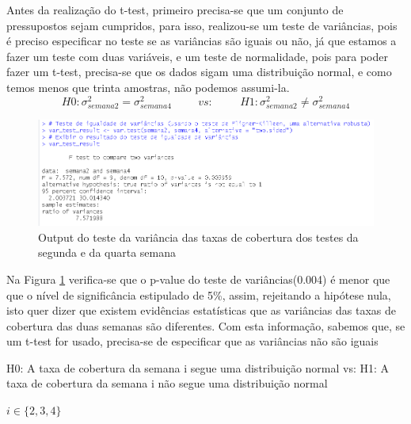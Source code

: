 \documentclass[%
 aip,
cp,  %
 amsmath,amssymb,%
 reprint,%
]{revtex4-2}
\begin{document}
Antes da realização do t-test, primeiro precisa-se que um conjunto de pressupostos sejam cumpridos, para isso, realizou-se um teste de variâncias, pois é preciso especificar no teste se as variâncias são iguais ou não, já que estamos a fazer um teste com duas variáveis, e um teste de normalidade, pois para poder fazer um t-test, precisa-se que os dados sigam uma distribuição normal, e como temos menos que trinta amostras, não podemos assumi-la.
\[ H0: \sigma^2_{semana2} = \sigma^2_{semana4}  \hspace{1cm} vs: \hspace{1cm} H1: \sigma^2_{semana2} \ne \sigma^2_{semana4} \]
\begin{figure}[h]
    \centering
    \includegraphics[width=15cm]{imagens/questao1/Output_variancia.png}
    \caption{Output do teste da variância das taxas de cobertura dos testes da segunda e da quarta semana}
    \label{Output_Variancia}
\end{figure}

Na Figura \ref{Output_Variancia} verifica-se que o p-value do teste de variâncias(0.004) é menor que que o nível de significância estipulado de 5\%, assim, rejeitando a hipótese nula, isto quer dizer que existem evidências estatísticas que as variâncias das taxas de cobertura das duas semanas são diferentes. Com esta informação, sabemos que, se um t-test for usado, precisa-se de especificar que as variâncias não são iguais


\begin{center}
    H0: A taxa de cobertura da semana i segue uma distribuição normal
    \newline
    vs:
    \newline
    H1: A taxa de cobertura da semana i não segue uma distribuição normal
    \newline
\end{center}
$i \in \{2, 3, 4\}$
\end{document}
